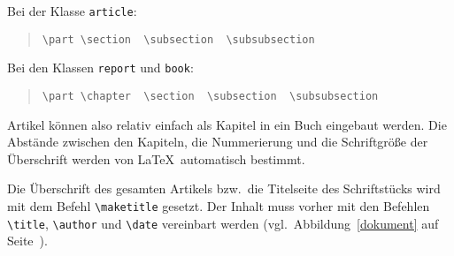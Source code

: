\pagebreak[3] %
\noindent Bei der Klasse \texttt{article}:
\begin{quote}
\lstinline|\part \section  \subsection  \subsubsection|
\end{quote}
Bei den Klassen \texttt{report} und \texttt{book}:
\begin{quote}
\lstinline|\part \chapter  \section  \subsection  \subsubsection|
\end{quote}
Artikel können also relativ einfach als Kapitel in ein Buch
eingebaut werden.  Die Abstände zwischen den Kapiteln, die
Nummerierung und die Schriftgröße der Überschrift werden von
\LaTeX\ automatisch bestimmt.



Die Überschrift des gesamten Artikels bzw.\ die Titelseite des
Schriftstücks wird mit dem Befehl \lstinline|\maketitle| gesetzt.
Der Inhalt muss vorher mit den Befehlen \lstinline|\title|,
\lstinline|\author| und \lstinline|\date| vereinbart werden (vgl.\
Abbildung~\ref{dokument} auf Seite~\pageref{dokument}).


